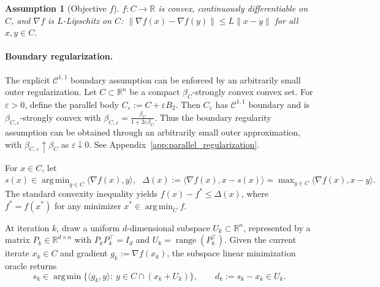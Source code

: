 \documentclass{article}
\DeclareMathOperator*{\argmin}{arg\,min}
\DeclareMathOperator{\range}{range}
\newtheorem{assumption}{Assumption}
\begin{document}
\begin{assumption}[Objective $f$]
\label{ass:f_clean}
$f:C\to\mathbb R$ is convex, continuously differentiable on $C$, and $\nabla f$ is $L$-Lipschitz on $C$: $\|\nabla f(x)-\nabla f(y)\|\le L\|x-y\|$ for all $x,y\in C$.
\end{assumption}

\paragraph{Boundary regularization.}
The explicit \(\mathcal C^{1,1}\) boundary assumption can be enforced by an arbitrarily
small outer regularization. Let \(C\subset\mathbb R^n\) be a compact
\(\beta_C\)-strongly convex convex set. For \(\varepsilon>0\), define the
parallel body $C_\varepsilon:=C+\varepsilon B_2.$
Then \(C_\varepsilon\) has \(\mathcal C^{1,1}\) boundary and is
\(\beta_{C,\varepsilon}\)-strongly convex with
$\beta_{C,\varepsilon}
    =
    \frac{\beta_C}{1+2\varepsilon\beta_C}.$
Thus the boundary regularity assumption can be obtained through an arbitrarily
small outer approximation, with
\(\beta_{C,\varepsilon}\uparrow\beta_C\) as \(\varepsilon\downarrow0\). See
Appendix~\ref{app:parallel_regularization}.

For \(x\in C\), let
$
s(x)\in\argmin_{y\in C}\langle\nabla f(x),y\rangle,\ \ \ 
\Delta(x):=\langle\nabla f(x),x-s(x)\rangle
=\max_{y\in C}\langle\nabla f(x),x-y\rangle .
$
The standard convexity inequality yields $f(x)-f^*\le \Delta(x)$, where $f^*=f(x^*)$ for any minimizer $x^*\in\argmin_C f$.

At iteration \(k\), draw a uniform \(d\)-dimensional subspace
\(U_k\subset\mathbb R^n\), represented by a matrix
\(P_k\in\mathbb R^{d\times n}\) with \(P_kP_k^\top=I_d\) and
\(U_k=\range(P_k^\top)\). Given the current iterate $x_k\in C$ and gradient $g_k:=\nabla f(x_k)$, the subspace linear minimization oracle returns
\begin{equation}
s_k\in \argmin\{\langle g_k,y\rangle:\ y\in C\cap(x_k+U_k)\},
\qquad d_k:=s_k-x_k\in U_k.
\label{eq:subLMO_clean}
\end{equation}
\end{document}
